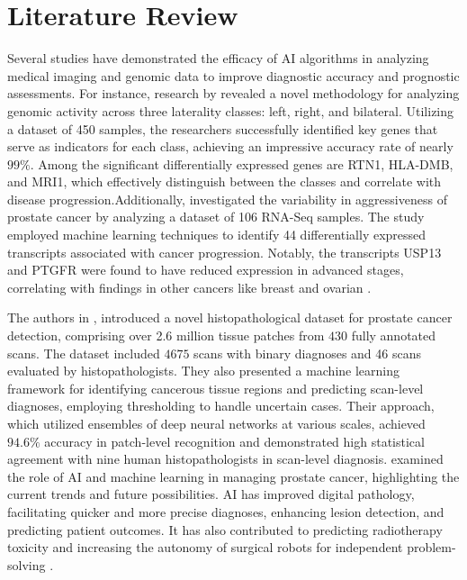 \section{Literature Review}
Several studies have demonstrated the efficacy of AI algorithms in analyzing medical imaging and genomic data to improve diagnostic accuracy and prognostic assessments. For instance, research by \cite{hamzeh2020prediction} revealed a novel methodology for analyzing genomic activity across three laterality classes: left, right, and bilateral. Utilizing a dataset of 450 samples, the researchers successfully identified key genes that serve as indicators for each class, achieving an impressive accuracy rate of nearly $99\%$. Among the significant differentially expressed genes are RTN1, HLA-DMB, and MRI1, which effectively distinguish between the classes and correlate with disease progression\cite{hamzeh2020prediction}.Additionally, \cite{singireddy2015identifying} investigated the variability in aggressiveness of prostate cancer by analyzing a dataset of 106 RNA-Seq samples. The study employed machine learning techniques to identify 44 differentially expressed transcripts associated with cancer progression. Notably, the transcripts USP13 and PTGFR were found to have reduced expression in advanced stages, correlating with findings in other cancers like breast and ovarian \cite{singireddy2015identifying}.

The authors in \cite{koziarski2024diagset}, introduced a novel histopathological dataset for prostate cancer detection, comprising over 2.6 million tissue patches from $430$ fully annotated scans. The dataset included $4675$ scans with binary diagnoses and 46 scans evaluated by histopathologists. They also presented a machine learning framework for identifying cancerous tissue regions and predicting scan-level diagnoses, employing thresholding to handle uncertain cases. Their approach, which utilized ensembles of deep neural networks at various scales, achieved $94.6\%$ accuracy in patch-level recognition and demonstrated high statistical agreement with nine human histopathologists in scan-level diagnosis\cite{koziarski2024diagset}.
\cite{tuataru2021artificial} examined the role of AI and machine learning in managing prostate cancer, highlighting the current trends and future possibilities. AI has improved digital pathology, facilitating quicker and more precise diagnoses, enhancing lesion detection, and predicting patient outcomes. It has also contributed to predicting radiotherapy toxicity and increasing the autonomy of surgical robots for independent problem-solving \cite{tuataru2021artificial}. 

